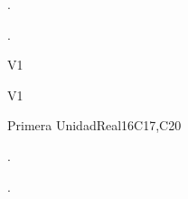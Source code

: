 \begin{syllabus}


\begin{justification}
.%
\end{justification}

\begin{goals}
\item .
\end{goals}

\begin{outcomes}{V1}
   \item {}
   \item {}
   \item {}
\end{outcomes}

\begin{competences}{V1}
    \item {}
    \item {}
    \item {}
\end{competences}

\begin{unit}{}{Primera Unidad}{Real}{16}{C17,C20}
\begin{topics}
      \item .
\end{topics}

\begin{learningoutcomes}
   \item .
\end{learningoutcomes}
\end{unit}

\begin{coursebibliography}
\end{coursebibliography}

\end{syllabus}
